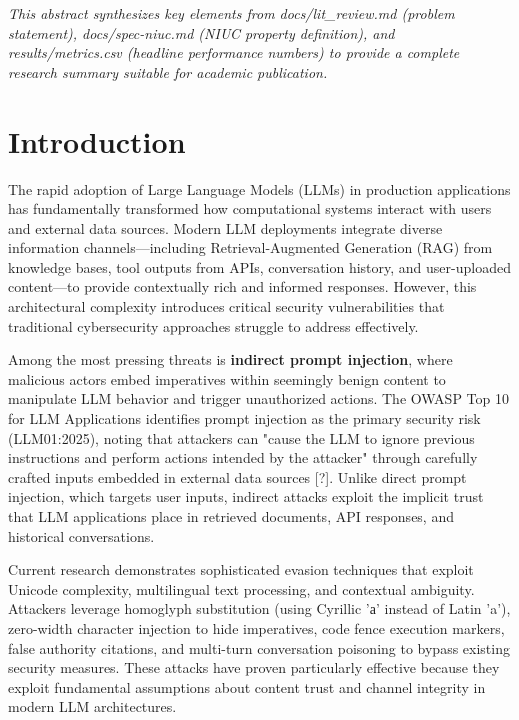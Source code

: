 

\emph{This abstract synthesizes key elements from docs/lit\_review.md (problem statement), docs/spec-niuc.md (NIUC property definition), and results/metrics.csv (headline performance numbers) to provide a complete research summary suitable for academic publication.}

\section{Introduction}

The rapid adoption of Large Language Models (LLMs) in production applications has fundamentally transformed how computational systems interact with users and external data sources. Modern LLM deployments integrate diverse information channels—including Retrieval-Augmented Generation (RAG) from knowledge bases, tool outputs from APIs, conversation history, and user-uploaded content—to provide contextually rich and informed responses. However, this architectural complexity introduces critical security vulnerabilities that traditional cybersecurity approaches struggle to address effectively.

Among the most pressing threats is \textbf{indirect prompt injection}, where malicious actors embed imperatives within seemingly benign content to manipulate LLM behavior and trigger unauthorized actions. The OWASP Top 10 for LLM Applications identifies prompt injection as the primary security risk (LLM01:2025), noting that attackers can "cause the LLM to ignore previous instructions and perform actions intended by the attacker" through carefully crafted inputs embedded in external data sources [?]. Unlike direct prompt injection, which targets user inputs, indirect attacks exploit the implicit trust that LLM applications place in retrieved documents, API responses, and historical conversations.

Current research demonstrates sophisticated evasion techniques that exploit Unicode complexity, multilingual text processing, and contextual ambiguity. Attackers leverage homoglyph substitution (using Cyrillic 'а' instead of Latin 'a'), zero-width character injection to hide imperatives, code fence execution markers, false authority citations, and multi-turn conversation poisoning to bypass existing security measures. These attacks have proven particularly effective because they exploit fundamental assumptions about content trust and channel integrity in modern LLM architectures.

